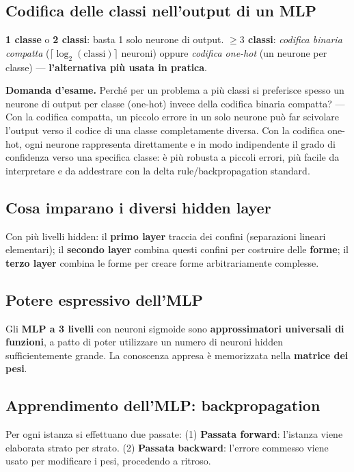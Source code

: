 \documentclass[11pt,a4paper]{report}
\newcommand{\domandaesame}[1]{\begin{esame}\textbf{Domanda d'esame.} #1\end{esame}}
\begin{document}
\subsection*{Codifica delle classi nell'output di un MLP}

\textbf{1 classe} o \textbf{2 classi}: basta 1 solo neurone di output. \textbf{$\ge 3$ classi}: \emph{codifica binaria compatta} ($\lceil\log_2(\text{classi})\rceil$ neuroni) oppure \emph{codifica one-hot} (un neurone per classe) --- \textbf{l'alternativa più usata in pratica}.

\domandaesame{Perché per un problema a più classi si preferisce spesso un neurone di output per classe (one-hot) invece della codifica binaria compatta? --- Con la codifica compatta, un piccolo errore in un solo neurone può far scivolare l'output verso il codice di una classe completamente diversa. Con la codifica one-hot, ogni neurone rappresenta direttamente e in modo indipendente il grado di confidenza verso una specifica classe: è più robusta a piccoli errori, più facile da interpretare e da addestrare con la delta rule/backpropagation standard.}

\subsection*{Cosa imparano i diversi hidden layer}

Con più livelli hidden: il \textbf{primo layer} traccia dei confini (separazioni lineari elementari); il \textbf{secondo layer} combina questi confini per costruire delle \textbf{forme}; il \textbf{terzo layer} combina le forme per creare forme arbitrariamente complesse.

\subsection*{Potere espressivo dell'MLP}

Gli \textbf{MLP a 3 livelli} con neuroni sigmoide sono \textbf{approssimatori universali di funzioni}, a patto di poter utilizzare un numero di neuroni hidden sufficientemente grande. La conoscenza appresa è memorizzata nella \textbf{matrice dei pesi}.

\subsection*{Apprendimento dell'MLP: backpropagation}

Per ogni istanza si effettuano due passate: (1) \textbf{Passata forward}: l'istanza viene elaborata strato per strato. (2) \textbf{Passata backward}: l'errore commesso viene usato per modificare i pesi, procedendo a ritroso.
\end{document}
